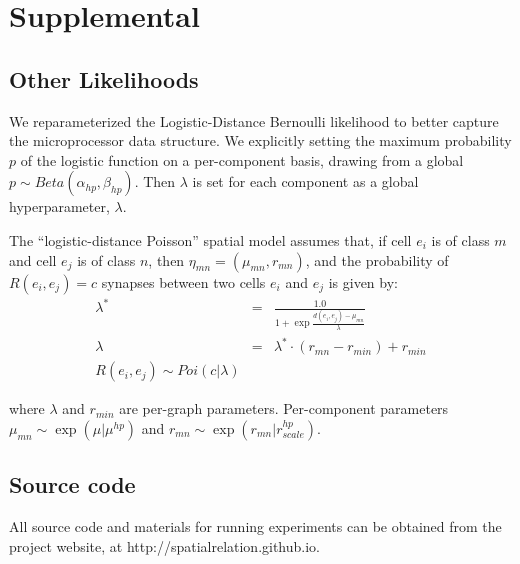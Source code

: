 \documentclass{article}
\begin{document}
\newpage
\section{Supplemental}

\subsection{Other Likelihoods}
\label{supp:otherlikelihoods}

We reparameterized the Logistic-Distance Bernoulli likelihood to
better capture the microprocessor data structure. We explicitly
setting the maximum probability $p$ of the logistic function on a
per-component basis, drawing from a global $p \sim Beta(\alpha_{hp},
\beta_{hp})$. Then $\lambda$ is set for each component as a global
hyperparameter, $\lambda$.


The ``logistic-distance Poisson'' spatial model assumes that, if cell
$e_i$ is of class $m$ and cell $e_j$ is of class $n$, then $\eta_{mn}
= (\mu_{mn}, r_{mn})$, and the probability of $R(e_i, e_j) = c$ synapses between two cells $e_i$ and $e_j$ is given by:
\begin{eqnarray}
\lambda^* &=& \frac{1.0}{1 + \exp \frac{d(e_i, e_j) - \mu_{mn}}{\lambda}}\\
\lambda & = & \lambda^* \cdot (r_{mn} - r_{min}) + r_{min} \\
R(e_i, e_j) \sim Poi(c | \lambda)
\end{eqnarray}

where $\lambda$ and $r_{min}$ are per-graph parameters. Per-component parameters $\mu_{mn} \sim \exp(\mu | \mu^{hp})$ and $r_{mn} \sim \exp(r_{mn} | r_{scale}^{hp})$. 

\subsection{Source code}

All source code and materials for running experiments can be
obtained from the project website, at http://spatialrelation.github.io. 
\end{document}

